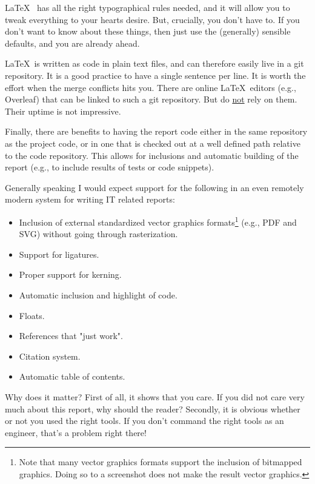 \documentclass[a4paper, oneside]{memoir}
\newcommand{\idx}[1]{\index{#1}\marginpar{\raggedright \tiny #1}}
\newcommand{\idxx}[2]{\index{#1}\marginpar{\raggedright \tiny #2}}
\begin{document}
\LaTeX\ \idxx{LaTeX@\LaTeX}{\LaTeX} has all the right typographical rules needed, and it will allow you to tweak everything to your hearts desire. But, crucially, you don't have to. If you don't want to know about these things, then just use the (generally) sensible defaults, and you are already ahead.

\LaTeX\ is written as code in plain text files, and can therefore easily live in a git repository. It is a good practice to have a single sentence per line. It is worth the effort when the merge conflicts hits you. There are online \LaTeX\ editors (e.g., Overleaf) that can be linked to such a git repository. But do \underline{not} rely on them. Their uptime is not impressive.

Finally, there are benefits to having the report code\idx{Code inclusion} either in the same repository as the project code, or in one that is checked out at a well defined path relative to the code repository. This allows for inclusions and automatic building of the report (e.g., to include results of tests or code snippets).

Generally speaking I would expect support for the following in an even remotely modern system for writing IT related reports:
\begin{itemize}
  \item Inclusion of external standardized vector graphics formats\footnote{Note that many vector graphics formats support the inclusion of bitmapped graphics. Doing so to a screenshot does not make the result vector graphics.} (e.g., PDF and SVG) without going through rasterization.
  \item Support for ligatures.
  \item Proper support for kerning.
  \item Automatic inclusion and highlight of code.
  \item Floats.
  \item References that "just work".
  \item Citation system.
  \item Automatic table of contents.
\end{itemize}

Why does it matter? First of all, it shows that you care. If you did not care very much about this report, why should the reader? Secondly, it is obvious whether or not you used the right tools. If you don't command the right tools as an engineer, that's a problem right there!
\end{document}
